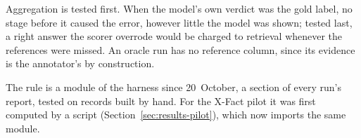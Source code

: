 Aggregation is tested first. When the model's own verdict was the gold
label, no stage before it caused the error, however little the model was
shown; tested last, a right answer the scorer overrode would be charged
to retrieval whenever the references were missed. An oracle run has no
reference column, since its evidence is the annotator's by
construction.

The rule is a module of the harness since 20~October, a section of
every run's report, tested on records built by hand. For the X-Fact
pilot it was first computed by a script (Section~\ref{sec:results-pilot}),
which now imports the same module.
